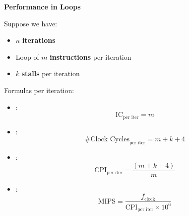 \highspace
\begin{flushleft}
    \textcolor{Green3}{ \textbf{Performance in Loops}}
\end{flushleft}
Suppose we have:
\begin{itemize}
    \item $n$ \textbf{iterations}
    \item Loop of $m$ \textbf{instructions} per iteration
    \item $k$ \textbf{stalls} per iteration
\end{itemize}
Formulas per iteration:
\begin{itemize}
    \item {}:
    \begin{equation}
        \text{IC}_{\text{per iter}} = m
    \end{equation}
    \item {}:
    \begin{equation}
        \text{\# Clock Cycles}_{\text{per iter}} = m + k + 4
    \end{equation}
    \item {}:
    \begin{equation}
        \text{CPI}_{\text{per iter}} = \dfrac{\left(m + k + 4\right)}{m}
    \end{equation}
    \item {}:
    \begin{equation}
        \text{MIPS} = \dfrac{f_{\text{clock}}}{\text{CPI}_{\text{per iter}} \times 10^{6}}
    \end{equation}
\end{itemize}

